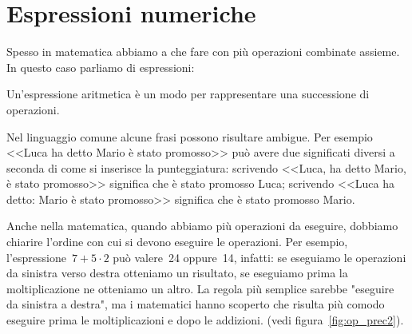 
\section{Espressioni numeriche}
\label{sec:01_espressioni}

Spesso in matematica abbiamo a che fare con più operazioni combinate 
assieme.
In questo caso parliamo di espressioni:

\begin{definizione}
 Un'espressione aritmetica è un modo per rappresentare una successione 
 di operazioni.
\end{definizione}

Nel linguaggio comune alcune frasi possono risultare ambigue. Per esempio
<<Luca ha detto Mario è stato promosso>> può avere due significati diversi
a seconda di come si inserisce la punteggiatura:
scrivendo <<Luca, ha detto Mario, è stato promosso>> significa che è stato 
promosso Luca;
scrivendo <<Luca ha detto: Mario è stato promosso>> significa che è stato 
promosso Mario.

Anche nella matematica, quando abbiamo più operazioni da eseguire, dobbiamo 
chiarire l'ordine con cui si devono eseguire le operazioni. 
Per esempio, l'espressione~\(7+5\cdot2\) può valere~24 oppure~14, infatti:
se eseguiamo le operazioni da sinistra verso destra otteniamo un risultato, 
se eseguiamo prima la moltiplicazione ne otteniamo un altro.
La regola più semplice sarebbe "eseguire da sinistra a destra", ma i 
matematici hanno scoperto che risulta più comodo eseguire prima le
moltiplicazioni e dopo le addizioni.
(vedi figura~\ref{fig:op_prec2}).
 
